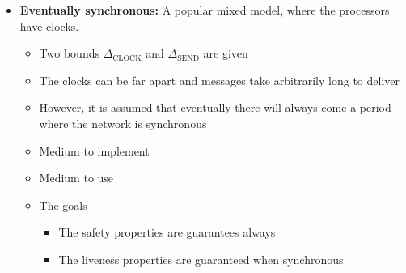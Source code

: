 \documentclass[11pt]{article}
\begin{document}
\begin{itemize}
\item \textbf{Eventually synchronous:} A popular mixed model, where the processors have clocks.
\begin{itemize}
\item Two bounds \(\Delta_\text{CLOCK}\) and \(\Delta_\text{SEND}\) are given
\item The clocks can be far apart and messages take arbitrarily long to deliver
\item However, it is assumed that eventually there will always come a period where the network is synchronous
\item Medium to implement
\item Medium to use
\item The goals
\begin{itemize}
\item The safety properties are guarantees always
\item The liveness properties are guaranteed when synchronous
\end{itemize}
\end{itemize}
\end{itemize}
\end{document}
